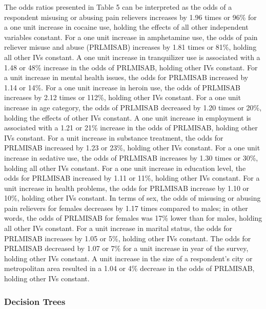 \documentclass[sigconf]{acmart}
\begin{document}
The odds ratios presented in Table 5 can be interpreted as the odds of a 
respondent misusing or abusing pain relievers increases by 1.96 times or 96\% 
for a one unit increase in cocaine use, holding the effects of all other 
independent variables constant. For a one unit increase in amphetamine use, 
the odds of pain reliever misuse and abuse (PRLMISAB) increases by 1.81 times
or 81\%, holding all other IVs constant. A one unit increase in tranquilizer 
use is associated with a 1.48 or 48\% increase in the odds of PRLMISAB, 
holding other IVs constant. For a unit increase in mental health issues, 
the odds for PRLMISAB increased by 1.14 or 14\%. For a one unit increase in 
heroin use, the odds of PRLMISAB increases by 2.12 times or 112\%, holding 
other IVs constant. For a one unit increase in age category, the odds of 
PRLMISAB decreased by 1.20 times or 20\%, holding the effects of other IVs 
constant. A one unit increase in employment is associated with a 1.21 or 21\% 
increase in the odds of PRLMISAB, holding other IVs constant. For a unit 
increase in substance treatment, the odds for PRLMISAB increased by 1.23 or 
23\%, holding other IVs constant. For a one unit increase in sedative use, 
the odds of PRLMISAB increases by 1.30 times or 30\%, holding all other IVs 
constant. For a one unit increase in education level, the odds for PRLMISAB 
increased by 1.11 or 11\%, holding other IVs constant. For a unit increase 
in health problems, the odds for PRLMISAB increase by 1.10 or 10\%, holding
other IVs constant. In terms of sex, the odds of misusing or abusing pain 
relievers for females decreases by 1.17 times compared to males; in other 
words, the odds of PRLMISAB for females was 17\% lower than for males, 
holding all other IVs constant. For a unit increase in marital status, 
the odds for PRLMISAB increases by 1.05 or 5\%, holding other IVs constant. 
The odds for PRLMISAB decreased by 1.07 or 7\% for a unit increase in year
of the survey, holding other IVs constant. A unit increase in the size of 
a respondent's city or metropolitan area resulted in a 1.04 or 4\% 
decrease in the odds of PRLMISAB, holding other IVs constant. 
 

\subsubsection{Decision Trees} 
\end{document}
